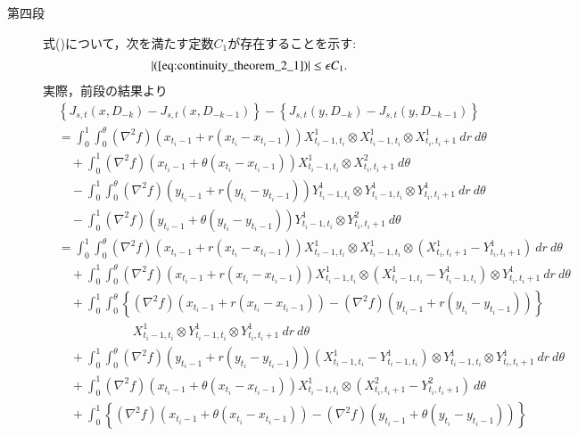 \begin{prf}
\begin{description}
			\item[第四段]
				式()について，次を満たす定数$C_1$が存在することを示す:
				\begin{align}
					|(\refeq{eq:continuity_theorem_2_1})| \leq \epsilon C_1.
					\label{eq:continuity_theorem_2_3}
				\end{align}
				実際，前段の結果より
				\begin{align}
					&\left\{ J_{s,t}(x,D_{-k}) - J_{s,t}(x,D_{-k-1}) \right\} - 
						\left\{ J_{s,t}(y,D_{-k}) - J_{s,t}(y,D_{-k-1}) \right\} \\
					&=	\int_0^1 \int_0^\theta (\nabla^2 f)(x_{t_i-1}+r(x_{t_i}-x_{t_i-1})) X^1_{t_i-1,t_i} \otimes X^1_{t_i-1,t_i} \otimes X^1_{t_i,t_i+1}\ dr\ d\theta \\
						&\quad + \int_0^1 (\nabla^2 f)(x_{t_i-1}+\theta(x_{t_i}-x_{t_i-1}))X^1_{t_i-1,t_i} \otimes X^2_{t_i,t_i+1}\ d\theta \\
						&\quad - \int_0^1 \int_0^\theta (\nabla^2 f)(y_{t_i-1}+r(y_{t_i}-y_{t_i-1})) Y^1_{t_i-1,t_i} \otimes Y^1_{t_i-1,t_i} \otimes Y^1_{t_i,t_i+1}\ dr\ d\theta \\
						&\quad - \int_0^1 (\nabla^2 f)(y_{t_i-1}+\theta(y_{t_i}-y_{t_i-1}))Y^1_{t_i-1,t_i} \otimes Y^2_{t_i,t_i+1}\ d\theta \\
					&= \int_0^1 \int_0^\theta (\nabla^2 f)(x_{t_i-1}+r(x_{t_i}-x_{t_i-1})) X^1_{t_i-1,t_i} \otimes X^1_{t_i-1,t_i} \otimes \left(X^1_{t_i,t_i+1} - Y^1_{t_i,t_i+1}\right)\ dr\ d\theta \\
						&\quad + \int_0^1 \int_0^\theta (\nabla^2 f)(x_{t_i-1}+r(x_{t_i}-x_{t_i-1})) X^1_{t_i-1,t_i} \otimes \left(X^1_{t_i-1,t_i} - Y^1_{t_i-1,t_i} \right) \otimes Y^1_{t_i,t_i+1}\ dr\ d\theta \\
						&\quad +  \int_0^1 \int_0^\theta \left\{ (\nabla^2 f)(x_{t_i-1}+r(x_{t_i}-x_{t_i-1})) - (\nabla^2 f)(y_{t_i-1}+r(y_{t_i}-y_{t_i-1})) \right\} \\
						&\qquad\qquad\qquad X^1_{t_i-1,t_i} \otimes Y^1_{t_i-1,t_i} \otimes Y^1_{t_i,t_i+1}\ dr\ d\theta \\
						&\quad + \int_0^1 \int_0^\theta (\nabla^2 f)(y_{t_i-1}+r(y_{t_i}-y_{t_i-1})) \left( X^1_{t_i-1,t_i} - Y^1_{t_i-1,t_i} \right) \otimes Y^1_{t_i-1,t_i} \otimes Y^1_{t_i,t_i+1}\ dr\ d\theta \\
						&\quad + \int_0^1 (\nabla^2 f)(x_{t_i-1}+\theta(x_{t_i}-x_{t_i-1}))X^1_{t_i-1,t_i} \otimes \left(X^2_{t_i,t_i+1} -  Y^2_{t_i,t_i+1}\right)\ d\theta \\
						&\quad + \int_0^1 \left\{ (\nabla^2 f) (x_{t_i-1}+\theta(x_{t_i}-x_{t_i-1})) - (\nabla^2 f)(y_{t_i-1}+\theta(y_{t_i}-y_{t_i-1})) \right\} \\

\end{align}
\end{description}
\end{prf}
